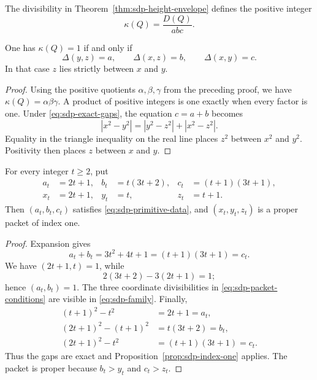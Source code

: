 The divisibility in Theorem~\ref{thm:sdp-height-envelope} defines the
positive integer
\begin{equation}
 \kappa(Q)=\frac{D(Q)}{abc}.
 \label{eq:sdp-index}
\end{equation}

\begin{proposition}
\label{prop:sdp-index-one}
One has $\kappa(Q)=1$ if and only if
\begin{equation}
 \Delta(y,z)=a,
 \qquad
 \Delta(x,z)=b,
 \qquad
 \Delta(x,y)=c.
 \label{eq:sdp-exact-gaps}
\end{equation}
In that case $z$ lies strictly between $x$ and $y$.
\end{proposition}

\begin{proof}
Using the positive quotients $\alpha,\beta,\gamma$ from the preceding proof,
we have $\kappa(Q)=\alpha\beta\gamma$.  A product of positive integers is one
exactly when every factor is one.  Under
\eqref{eq:sdp-exact-gaps}, the equation $c=a+b$ becomes
\[
 |x^2-y^2|=|y^2-z^2|+|x^2-z^2|.
\]
Equality in the triangle inequality on the real line places $z^2$ between
$x^2$ and $y^2$.  Positivity then places $z$ between $x$ and $y$.
\end{proof}

\begin{proposition}
\label{prop:sdp-family}
For every integer $t\ge2$, put
\begin{equation}
\begin{aligned}
 a_t&=2t+1,&
 b_t&=t(3t+2),&
 c_t&=(t+1)(3t+1),\\
 x_t&=2t+1,& y_t&=t,& z_t&=t+1.
\end{aligned}
\label{eq:sdp-family}
\end{equation}
Then $(a_t,b_t,c_t)$ satisfies
\eqref{eq:sdp-primitive-data}, and $(x_t,y_t,z_t)$ is a proper packet of
index one.
\end{proposition}

\begin{proof}
Expansion gives
\[
 a_t+b_t=3t^2+4t+1=(t+1)(3t+1)=c_t.
\]
We have $(2t+1,t)=1$, while
\[
 2(3t+2)-3(2t+1)=1;
\]
hence $(a_t,b_t)=1$.  The three coordinate divisibilities in
\eqref{eq:sdp-packet-conditions} are visible in
\eqref{eq:sdp-family}.  Finally,
\begin{align*}
 (t+1)^2-t^2&=2t+1=a_t,\\
 (2t+1)^2-(t+1)^2&=t(3t+2)=b_t,\\
 (2t+1)^2-t^2&=(t+1)(3t+1)=c_t.
\end{align*}
Thus the gaps are exact and
Proposition~\ref{prop:sdp-index-one} applies.  The packet is proper because
$b_t>y_t$ and $c_t>z_t$.
\end{proof}

